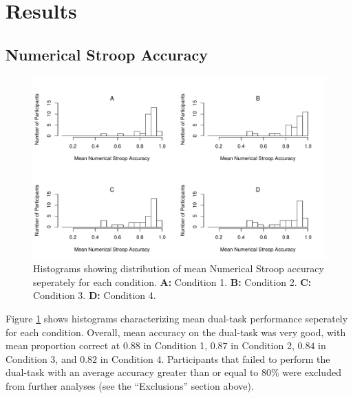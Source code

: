 \documentclass[apacite,draftfirst,man]{apa6}
\begin{document}
\section*{Results}
\subsection*{Numerical Stroop Accuracy}
\begin{figure}[t]
\centering \includegraphics[width=1.0\textwidth]{../figures/fig_exc_dual.pdf}
    \caption{ Histograms showing distribution of mean Numerical Stroop accuracy
seperately for each condition. \textbf{A:} Condition 1. \textbf{B:} Condition 2.
\textbf{C:} Condition 3. \textbf{D:} Condition 4. }
    \label{fig:exc_dual}
\end{figure}

Figure \ref{fig:exc_dual} shows histograms characterizing mean dual-task
performance seperately for each condition. Overall, mean accuracy on the
dual-task was very good, with mean proportion correct at $0.88$ in Condition 1,
$0.87$ in Condition 2, $0.84$ in Condition 3, and $0.82$ in Condition 4.
Participants that failed to perform the dual-task with an average accuracy
greater than or equal to 80\% were excluded from further analyses (see the
``Exclusions'' section above).
\end{document}
